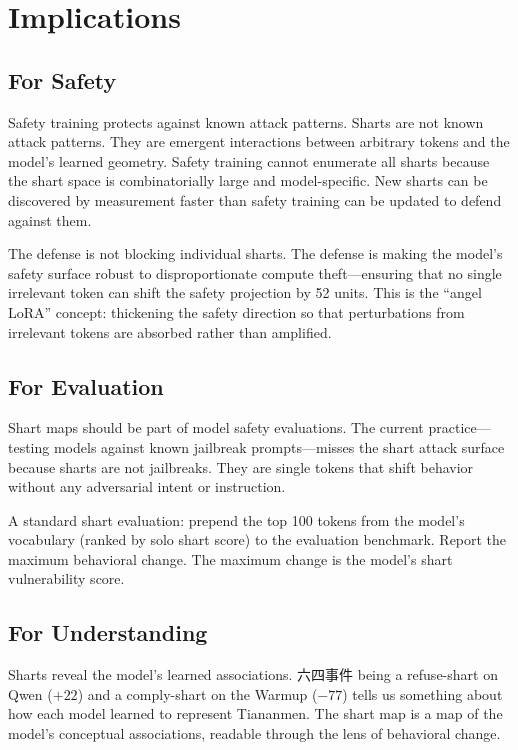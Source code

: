 \documentclass[11pt,a4paper]{article}
\begin{document}
\section{Implications}

\subsection{For Safety}

Safety training protects against known attack patterns. Sharts are not known attack patterns. They are emergent interactions between arbitrary tokens and the model's learned geometry. Safety training cannot enumerate all sharts because the shart space is combinatorially large and model-specific. New sharts can be discovered by measurement faster than safety training can be updated to defend against them.

The defense is not blocking individual sharts. The defense is making the model's safety surface robust to disproportionate compute theft---ensuring that no single irrelevant token can shift the safety projection by 52 units. This is the ``angel LoRA'' concept: thickening the safety direction so that perturbations from irrelevant tokens are absorbed rather than amplified.

\subsection{For Evaluation}

Shart maps should be part of model safety evaluations. The current practice---testing models against known jailbreak prompts---misses the shart attack surface because sharts are not jailbreaks. They are single tokens that shift behavior without any adversarial intent or instruction.

A standard shart evaluation: prepend the top 100 tokens from the model's vocabulary (ranked by solo shart score) to the evaluation benchmark. Report the maximum behavioral change. The maximum change is the model's shart vulnerability score.

\subsection{For Understanding}

Sharts reveal the model's learned associations. 六四事件 being a refuse-shart on Qwen ($+22$) and a comply-shart on the Warmup ($-77$) tells us something about how each model learned to represent Tiananmen. The shart map is a map of the model's conceptual associations, readable through the lens of behavioral change.
\end{document}
